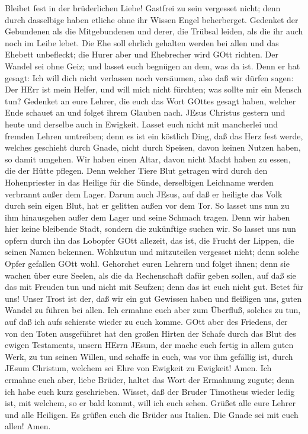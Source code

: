  Bleibet fest in der brüderlichen Liebe! 
Gastfrei zu sein vergesset nicht; denn durch dasselbige haben etliche
ohne ihr Wissen Engel beherberget.  Gedenket der Gebundenen
als die Mitgebundenen und derer, die Trübsal leiden, als die ihr auch
noch im Leibe lebet.  Die Ehe soll ehrlich gehalten werden
bei allen und das Ehebett unbefleckt; die Hurer aber und Ehebrecher wird
GOtt richten.  Der Wandel sei ohne Geiz; und lasset euch
begnügen an dem, was da ist. Denn er hat gesagt: Ich will dich nicht
verlassen noch versäumen,  also daß wir dürfen sagen: Der
HErr ist mein Helfer, und will mich nicht fürchten; was sollte mir ein
Mensch tun?  Gedenket an eure Lehrer, die euch das Wort
GOttes gesagt haben, welcher Ende schauet an und folget ihrem Glauben
nach.  JEsus Christus gestern und heute und derselbe auch in
Ewigkeit.  Lasset euch nicht mit mancherlei und fremden
Lehren umtreiben; denn es ist ein köstlich Ding, daß das Herz fest
werde, welches geschieht durch Gnade, nicht durch Speisen, davon keinen
Nutzen haben, so damit umgehen.  Wir haben einen Altar,
davon nicht Macht haben zu essen, die der Hütte pflegen. 
Denn welcher Tiere Blut getragen wird durch den Hohenpriester in das
Heilige für die Sünde, derselbigen Leichname werden verbrannt außer dem
Lager.  Darum auch JEsus, auf daß er heiligte das Volk
durch sein eigen Blut, hat er gelitten außen vor dem Tor. 
So lasset uns nun zu ihm hinausgehen außer dem Lager und seine Schmach
tragen.  Denn wir haben hier keine bleibende Stadt, sondern
die zukünftige suchen wir.  So lasset uns nun opfern durch
ihn das Lobopfer GOtt allezeit, das ist, die Frucht der Lippen, die
seinen Namen bekennen.  Wohlzutun und mitzuteilen vergesset
nicht; denn solche Opfer gefallen GOtt wohl.  Gehorchet
euren Lehrern und folget ihnen; denn sie wachen über eure Seelen, als
die da Rechenschaft dafür geben sollen, auf daß sie das mit Freuden tun
und nicht mit Seufzen; denn das ist euch nicht gut.  Betet
für uns! Unser Trost ist der, daß wir ein gut Gewissen haben und
fleißigen uns, guten Wandel zu führen bei allen.  Ich
ermahne euch aber zum Überfluß, solches zu tun, auf daß ich aufs
schierste wieder zu euch komme.  GOtt aber des Friedens,
der von den Toten ausgeführet hat den großen Hirten der Schafe durch das
Blut des ewigen Testaments, unsern HErrn JEsum,  der mache
euch fertig in allem guten Werk, zu tun seinen Willen, und schaffe in
euch, was vor ihm gefällig ist, durch JEsum Christum, welchem sei Ehre
von Ewigkeit zu Ewigkeit! Amen.  Ich ermahne euch aber,
liebe Brüder, haltet das Wort der Ermahnung zugute; denn ich habe euch
kurz geschrieben.  Wisset, daß der Bruder Timotheus wieder
ledig ist, mit welchem, so er bald kommt, will ich euch sehen.
 Grüßet alle eure Lehrer und alle Heiligen. Es grüßen euch
die Brüder aus Italien.  Die Gnade sei mit euch allen!
Amen.
